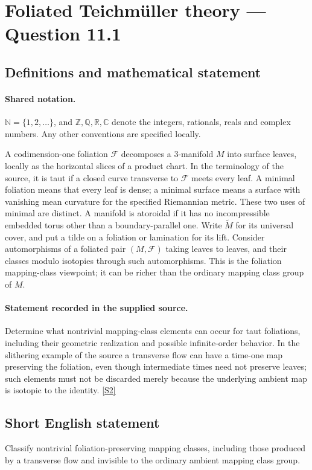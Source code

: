 \documentclass[11pt]{article}
\newcommand{\sref}[2]{\hyperlink{source:#1:#2}{[S#2]}}
\begin{document}
\section{Foliated Teichmüller theory — Question 11.1}\label{statement}

\subsection{Definitions and mathematical statement}

\paragraph{Shared notation.}$\mathbb N=\{1,2,\ldots\}$, and $\mathbb Z,\mathbb Q,\mathbb R,\mathbb C$ denote the integers, rationals, reals and complex numbers. Any other conventions are specified locally.


A codimension-one foliation $\mathcal F$ decomposes a $3$-manifold $M$ into surface leaves, locally as the horizontal slices of a product chart. In the terminology of the source, it is taut if a closed curve transverse to $\mathcal F$ meets every leaf. A minimal foliation means that every leaf is dense; a minimal surface means a surface with vanishing mean curvature for the specified Riemannian metric. These two uses of minimal are distinct. A manifold is atoroidal if it has no incompressible embedded torus other than a boundary-parallel one. Write $\widetilde M$ for its universal cover, and put a tilde on a foliation or lamination for its lift. Consider automorphisms of a foliated pair $(M,\mathcal F)$ taking leaves to leaves, and their classes modulo isotopies through such automorphisms. This is the foliation mapping-class viewpoint; it can be richer than the ordinary mapping class group of $M$.
\paragraph{Statement recorded in the supplied source.}
Determine what nontrivial mapping-class elements can occur for taut foliations, including their geometric realization and possible infinite-order behavior. In the slithering example of the source a transverse flow can have a time-one map preserving the foliation, even though intermediate times need not preserve leaves; such elements must not be discarded merely because the underlying ambient map is isotopic to the identity. \sref{statement}{2}
\subsection{Short English statement}
Classify nontrivial foliation-preserving mapping classes, including those produced by a transverse flow and invisible to the ordinary ambient mapping class group.
\end{document}
